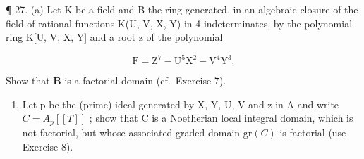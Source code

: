 ¶ 27. (a) Let K be a field and B the ring generated, in an algebraic closure of the field of rational functions K(U, V, X, Y) in 4 indeterminates, by the polynomial ring K{[}U, V, X, Y{]} and a root z of the polynomial

\[
\mathrm{F} = \mathrm{Z} ^ {7} - \mathrm{U} ^ {5} \mathrm{X} ^ {2} - \mathrm{V} ^ {4} \mathrm{Y} ^ {3}.
\]

Show that \(\mathbf{B}\) is a factorial domain (cf.~Exercise 7).

\begin{enumerate}
\def\labelenumi{(\alph{enumi})}
\setcounter{enumi}{1}
\tightlist
\item
  Let p be the (prime) ideal generated by X, Y, U, V and z in A and write \(C = A_{p}[[T]]\) ; show that C is a Noetherian local integral domain, which is not factorial, but whose associated graded domain \(\text{gr}(C)\) is factorial (use Exercise 8).
\end{enumerate}
\relax{}
